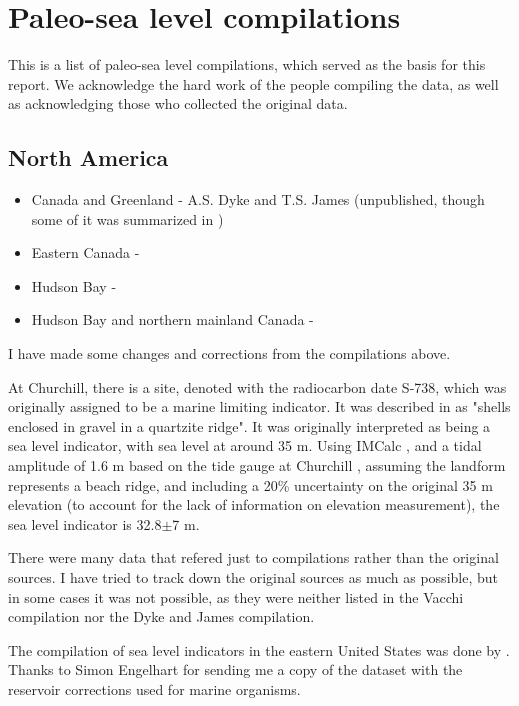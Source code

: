 \section{Paleo-sea level compilations}

This is a list of paleo-sea level compilations, which served as the basis for this report. We acknowledge the hard work of the people compiling the data, as well as acknowledging those who collected the original data.

\subsection{North America}

\begin{itemize}
  \item Canada and Greenland - A.S. Dyke and T.S. James (unpublished, though some of it was summarized in \citep{DykePeltier2000})
  \item Eastern Canada - \citet{VacchiEtal2018}
  \item Hudson Bay - \citet{SimonEtal2016}
  \item Hudson Bay and northern mainland Canada - \citet{GowanEtal2016}
\end{itemize}

I have made some changes and corrections from the compilations above.

At Churchill, there is a site, denoted with the radiocarbon date S-738, which was originally assigned to be a marine limiting indicator. It was described in \citet{MorlanEtal2000} as "shells enclosed in gravel in a quartzite ridge". It was originally interpreted as being a sea level indicator, with sea level at around 35 m. Using IMCalc  \citep{LorscheidRovere2019}, and a tidal amplitude of 1.6 m based on the tide gauge at Churchill \citep{Ray2016}, assuming the landform represents a beach ridge, and including a 20\% uncertainty on the original 35 m elevation (to account for the lack of information on elevation measurement), the sea level indicator is 32.8$\pm$7 m.

There were many data that refered just to compilations rather than the original sources. I have tried to track down the original sources as much as possible, but in some cases it was not possible, as they were neither listed in the Vacchi compilation nor the Dyke and James compilation.

The compilation of sea level indicators in the eastern United States was done by \citet{EngelhartHorton2012}. Thanks to Simon Engelhart for sending me a copy of the dataset with the reservoir corrections used for marine organisms.

